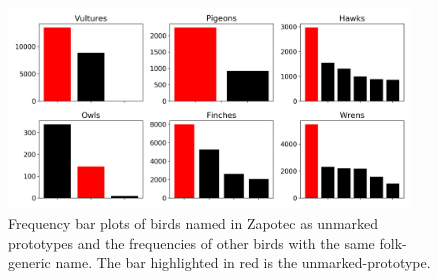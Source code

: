 \documentclass[10pt,letterpaper]{article}
\begin{document}


\begin{figure}[ht!]
  \begin{center}
    \includegraphics[width=0.95\textwidth]{./figures/prototypes-barplots-all.png}
        \caption{Frequency bar plots of birds named in Zapotec as unmarked prototypes and the frequencies of other birds with the same folk-generic name. The bar highlighted in red is the unmarked-prototype.}
        \label{fig-freq-prototype-all}
  \end{center}
\end{figure}


\end{document}
